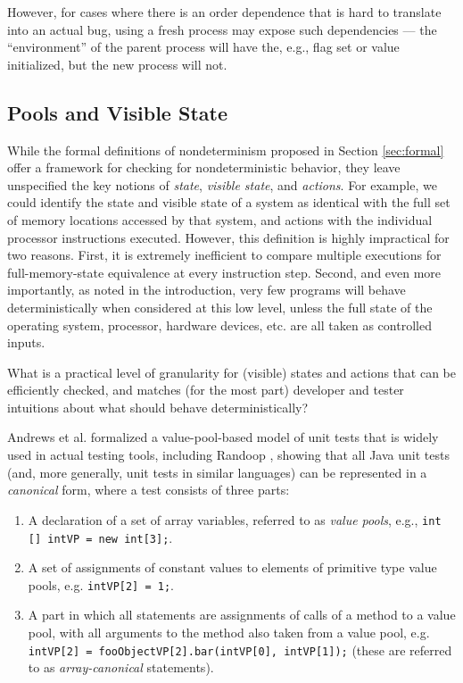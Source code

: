 However, for cases where
there is an order dependence that is hard to translate into an
actual bug, using a fresh
process may expose such dependencies --- the ``environment'' of the
parent process will have the, e.g., flag set or value initialized, but
the new process will not.

\subsection{Pools and Visible State}

While the formal definitions of nondeterminism proposed in Section
\ref{sec:formal} offer a framework for checking for nondeterministic
behavior, they leave unspecified the key notions of \emph{state},
\emph{visible state}, and \emph{actions}.  For example, we could
identify the state and visible state of a system as identical with the
full set of memory locations accessed by that system, and actions with the
individual processor instructions executed.  However, this
definition is highly impractical for two reasons.  First, it is
extremely inefficient to compare multiple executions for
full-memory-state equivalence at every instruction step.  Second, and
even more importantly, as noted in the introduction, very few programs
will behave deterministically when considered at this low level,
unless the full state of the operating system, processor, hardware
devices, etc. are all taken as controlled inputs.

What is a practical level of granularity for (visible) states and actions that
can be efficiently checked, and matches (for the most part) developer
and tester intuitions about what should behave deterministically?

Andrews et al. formalized a value-pool-based model of unit tests that is widely used in
actual testing tools, including Randoop \cite{Pacheco}, showing that
all Java unit tests (and, more generally, unit tests in similar
languages) can be represented in a \emph{canonical} form, where
a test consists of three parts:

\begin{enumerate}
\item A declaration of a set of array variables, referred to as
  \emph{value pools}, e.g., {\tt int [] intVP = new int[3];}.
  \item A set of assignments of constant values to elements of
    primitive type value pools, e.g. {\tt intVP[2] = 1;}.
    \item A part in which all statements are assignments of calls of a
      method to a value pool, with all arguments to the method also
      taken from a value pool, e.g. {\tt intVP[2] = fooObjectVP[2].bar(intVP[0],
        intVP[1]);} (these are referred to as \emph{array-canonical} statements).
    \end{enumerate}

